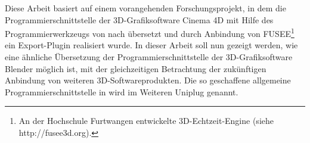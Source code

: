  \label{sec:Frage}

Diese Arbeit basiert auf einem vorangehenden Forschungsprojekt, in dem die Programmierschnittstelle der 3D-Grafiksoftware Cinema 4D mit Hilfe des Programmierwerkzeugs  von \CC nach \CS übersetzt und durch Anbindung von FUSEE\footnote{An der Hochschule Furtwangen entwickelte 3D-Echtzeit-Engine (siehe http://fusee3d.org).} ein Export-Plugin realisiert wurde.
In dieser Arbeit soll nun gezeigt werden, wie eine ähnliche Übersetzung der Programmierschnittstelle der 3D-Grafiksoftware Blender möglich ist, mit der gleichzeitigen Betrachtung der zukünftigen Anbindung von weiteren 3D-Softwareprodukten. Die so geschaffene allgemeine Programmierschnittstelle in \CS wird im Weiteren Uniplug genannt.


